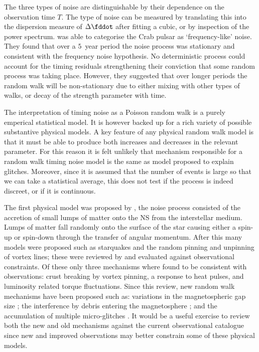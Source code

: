 The three types of noise are distinguishable by their dependence on the
observation time $T$. The type of noise can be measured by translating this
into the dispersion measure of $\Delta\fddot$ after fitting a cubic, or by
inspection of the power spectrum.  \citet{Boynton1972} was able to categorise
the Crab pulsar as `frequency-like' noise.  They found that over a $5$~year
period the noise process was stationary and consistent with the frequency noise
hypothesis. No deterministic process could account for the timing residuals
strengthening their conviction that some random process was taking place.
However, they suggested that over longer periods the random walk will be
non-stationary due to either mixing with other types of walks, or decay of the
strength parameter with time.

The interpretation of timing noise as a Poisson random walk is a purely
emperical statistical model. It is however backed up for a rich variety of
possible substantive physical models.  A key feature of any physical random
walk model is that it must be able to produce both increases and decreases in
the relevant parameter. For this reason it is felt unlikely that mechanism
responsible for a random walk timing noise model is the same as model proposed
to explain glitches. Moreover, since it is assumed that the number of events
is large so that we can take a statistical average, this does not test if the
process is indeed discreet, or if it is continuous.

The first physical model was proposed by \citet{Boynton1972}, the noise process
consisted of the accretion of small lumps of matter onto the NS from the
interstellar medium. Lumps of matter fall randomly onto the surface of the star
causing either a spin-up or spin-down through the transfer of angular momentum.
After this many models were proposed such as starquakes and the random pinning
and unpinning of vortex lines; these were reviewed by \citet{Cordes1981} and
evaluated against observational constraints. Of these only three mechanisms
where found to be consistent with observations: crust breaking by vortex pinning, a
response to heat pulses, and luminosity related torque fluctuations. Since this
review, new random walk mechanisms have been proposed such as: variations in
the magnetospheric gap size \citep{Cheng1987}; the interference by debris entering
the magnetosphere \citep{Cordes2008}; and the accumulation of multiple micro-glitches
\citep{Janssen2006}. It would be a useful exercise to review both the new and
old mechanisms against the current observational catalogue since new and improved
observations may better constrain some of these physical models.

